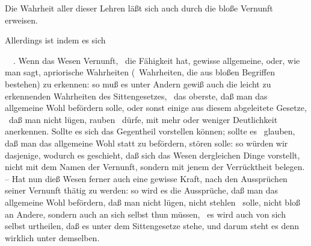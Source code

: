 Die Wahrheit aller dieser Lehren läßt sich auch durch die bloße Vernunft erweisen.
\begin{aufza}
\item Allerdings ist  indem es sich
\item {}~\ . Wenn das Wesen Vernunft, \dh\  die Fähigkeit hat, gewisse allgemeine, oder, wie man sagt, apriorische Wahrheiten (\dh\ Wahrheiten, die aus bloßen Begriffen bestehen) zu erkennen: so muß es unter Andern gewiß auch die leicht zu erkennenden Wahrheiten des Sittengesetzes, \zB\  das oberste, daß man das allgemeine Wohl befördern solle, oder sonst einige aus diesem abgeleitete Gesetze, \zB\  daß man nicht lügen, rauben \udgl\  dürfe, mit mehr oder weniger Deutlichkeit anerkennen. Sollte es sich das Gegentheil vorstellen können; sollte es \zB\  glauben, daß man das allgemeine Wohl statt zu befördern, stören solle: so würden wir dasjenige, wodurch es geschieht, daß sich das Wesen dergleichen Dinge vorstellt, nicht mit dem Namen der Vernunft, sondern mit jenem der Verrücktheit belegen. -- Hat nun dieß Wesen ferner auch eine gewisse Kraft, nach den Aussprüchen seiner Vernunft thätig zu werden: so wird es die Aussprüche, daß man das allgemeine Wohl befördern, daß man nicht lügen, nicht stehlen \udgl\  solle, nicht bloß an Andere, sondern auch an sich selbst thun müssen, \dh\  es wird auch von sich selbst urtheilen, daß es unter dem Sittengesetze stehe, und darum steht es denn wirklich unter demselben.

\end{aufza}
